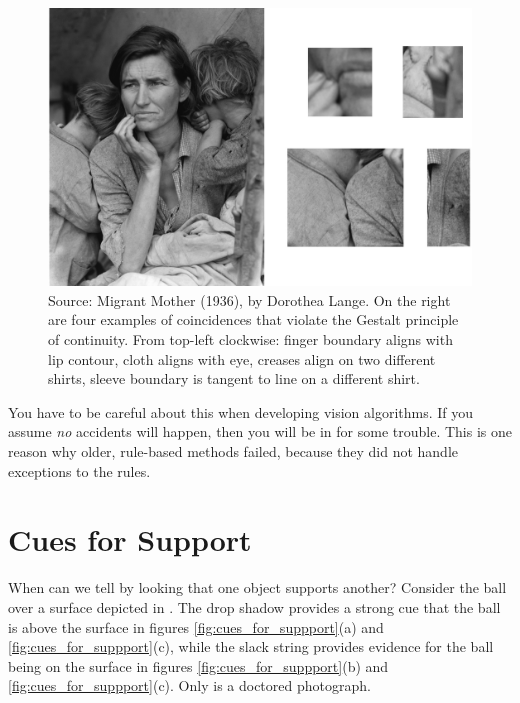 \begin{figure}[h!]
\centerline{
\includegraphics[width=1\linewidth]{figures/visionscience/accidents_migrant_mother.jpg}}
\caption{Source: Migrant Mother (1936), by Dorothea Lange. On the right are four examples of coincidences that violate the Gestalt principle of continuity. From top-left clockwise: finger boundary aligns with lip contour, cloth aligns with eye, creases align on two different shirts, sleeve boundary is tangent to line on a different shirt.}
\label{fig:visionscience:migrant_mother}
\end{figure}

You have to be careful about this when developing vision algorithms. If you assume \textit{no} accidents will happen, then you will be in for some trouble. This is one reason why older, rule-based methods failed, because they did not handle exceptions to the rules.




\section{Cues for Support}

When can we tell by looking that one object supports another?  Consider the ball over a surface depicted in \fig{\ref{fig:cues_for_suppport}}.  The drop shadow provides a strong cue that the ball is above the surface in figures \ref{fig:cues_for_suppport}(a) and \ref{fig:cues_for_suppport}(c), while the slack string provides evidence for the ball being on the surface in figures \ref{fig:cues_for_suppport}(b) and \ref{fig:cues_for_suppport}(c).  
Only  is a doctored photograph.

